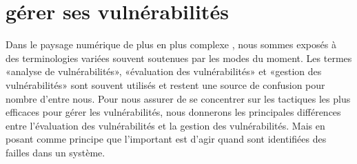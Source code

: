 

\section{gérer ses vulnérabilités}
\label{CHAP_GESTVUL}


Dans le paysage numérique de plus en plus complexe , nous sommes exposés à des terminologies variées souvent soutenues par les modes du moment. Les termes «analyse de vulnérabilités», «évaluation des vulnérabilités» et «gestion des vulnérabilités» sont souvent utilisés et restent une source de confusion pour nombre d’entre nous. Pour nous assurer de se concentrer sur les tactiques les plus efficaces pour gérer les vulnérabilités, nous donnerons les principales différences entre l’évaluation des vulnérabilités et la gestion des vulnérabilités. Mais en posant comme principe que l'important est d'agir quand sont identifiées des failles dans un système.

